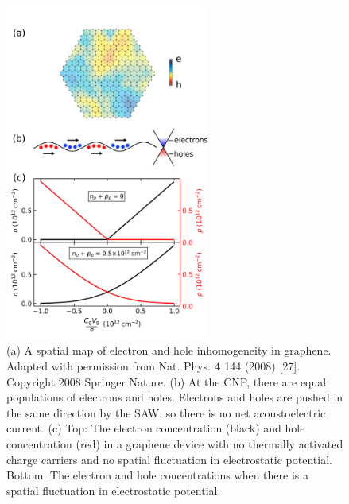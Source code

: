 \documentclass{beavtex_dub_edit}
\begin{document}
\begin{figure}
    \includegraphics[width =  0.6\textwidth]{Figure 3 n and p_corrected.png}
    \caption{(a) A spatial map of electron and hole inhomogeneity in graphene. Adapted with permission from Nat. Phys. \textbf{4} 144 (2008) [27]. Copyright 2008 Springer Nature. (b) At the CNP, there are equal populations of electrons and holes. Electrons and holes are pushed in the same direction by the SAW, so there is no net acoustoelectric current. (c) Top: The electron concentration (black) and hole concentration (red) in a graphene device with no thermally activated charge carriers and no spatial fluctuation in electrostatic potential. Bottom: The electron and hole concentrations when there is a spatial fluctuation in electrostatic potential.}
    \label{AECP Figure 3}
\end{figure}
\end{document}
